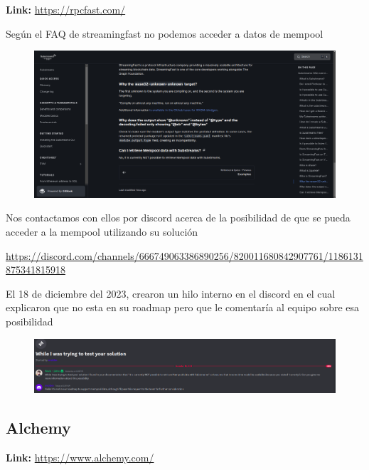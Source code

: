 \textbf{Link:} \url{https://rpcfast.com/}

\medskip

Según el FAQ de streamingfast no podemos acceder a datos de mempool

\begin{figure}
    \centering
    \includegraphics[width=1\linewidth]{img//screenshots/Screenshot from 2023-12-15 23-32-19.png}
\end{figure}

Nos contactamos con ellos por discord acerca de la posibilidad de que se pueda acceder a la mempool utilizando su solución 

\url{https://discord.com/channels/666749063386890256/820011680842907761/1186131875341815918}

El 18 de diciembre del 2023, crearon un hilo interno en el discord en el cual explicaron que no esta en su roadmap pero que le comentaría al equipo sobre esa posibilidad

\begin{figure}
    \centering
    \includegraphics[width=1\linewidth]{Screenshot from 2023-12-18 13-36-09.png}
\end{figure}

\clearpage
\subsection{Alchemy}

\textbf{Link:} \url{https://www.alchemy.com/}

\medskip

